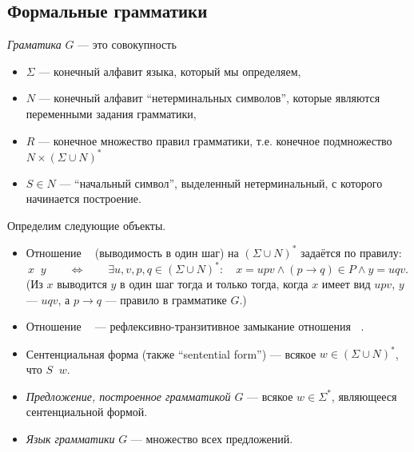 \documentclass[12pt,a4paper]{article}
\begin{document}
    \subsection{Формальные грамматики}

    \begin{definition}
        \emph{Граматика} $G$ --- это совокупность
        \begin{itemize}
            \item $\Sigma$ --- конечный алфавит языка, который мы определяем,
            \item $N$ --- конечный алфавит ``нетерминальных символов'', которые являются переменными задания грамматики,
            \item $R$ --- конечное множество правил грамматики, т.е. конечное подмножество $N \times (\Sigma \cup N)^*$
            \item $S \in N$ --- ``начальный символ'', выделенный нетерминальный, с которого начинается построение.
        \end{itemize}
        
        Определим следующие объекты.
        \begin{itemize}
            \item Отношение $\mathop{\underset{G}{\Rightarrow}}$ (выводимость в один шаг) на $(\Sigma \cup N)^*$ задаётся по правилу:
                \[
                    x \mathop{\underset{G}{\Rightarrow}} y
                    \qquad \Longleftrightarrow \qquad
                    \exists u, v, p, q \in (\Sigma \cup N)^* \colon \quad x = upv \wedge (p \rightarrow q) \in P \wedge y = uqv.
                \]
                (Из $x$ выводится $y$ в один шаг тогда и только тогда, когда $x$ имеет вид $upv$, $y$ --- $uqv$, а $p \to q$ --- правило в грамматике $G$.)
            \item Отношение $\mathop{\overset{*}{\underset{G}{\Rightarrow}}}$ --- рефлексивно-транзитивное замыкание отношения $\mathop{\underset{G}{\Rightarrow}}$.
            \item Сентенциальная форма (также ``sentential form'') --- всякое $w \in (\Sigma \cup N)^*$, что $S \mathop{\overset{*}{\underset{G}{\Rightarrow}}} w$.
            \item \emph{Предложение, построенное грамматикой $G$} --- всякое $w \in \Sigma^*$, являющееся сентенциальной формой.
            \item \emph{Язык грамматики} $G$ --- множество всех предложений.
        \end{itemize}
    \end{definition}
\end{document}
